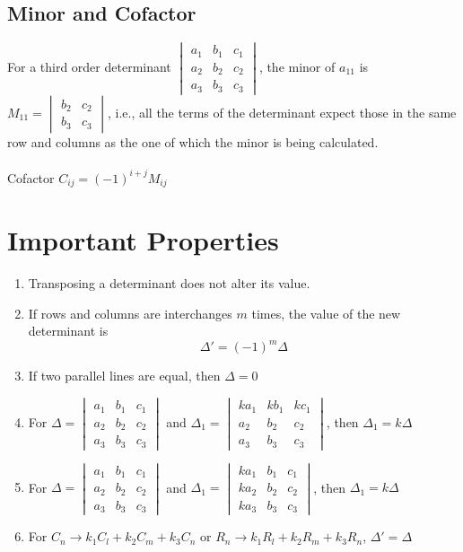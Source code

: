\documentclass[openany, oneside]{book}
\begin{document}
\subsection{Minor and Cofactor}
For a third order determinant
$\begin{vmatrix}
a_1&b_1&c_1\\
a_2&b_2&c_2\\
a_3&b_3&c_3
\end{vmatrix}$, the minor of $a_{11}$ is $M_{11}=\begin{vmatrix}b_2&c_2\\b_3&c_3\end{vmatrix}$, i.e., all the terms of the determinant expect those in the same row and columns as the one of which the minor is being calculated.
\paragraph{}Cofactor $C_{ij}=(-1)^{i+j} M_{ij}$

\section{Important Properties}
\begin{enumerate}
\item Transposing a determinant does not alter its value.
\item If rows and columns are interchanges $m$ times, the value of the new determinant is
\begin{equation}
\Delta'=(-1)^m \Delta
\end{equation}
\item If two parallel lines are equal, then $\Delta=0$
\item For $\Delta=\begin{vmatrix}a_1&b_1&c_1\\a_2&b_2&c_2\\a_3&b_3&c_3\end{vmatrix}$ and $\Delta_1=\begin{vmatrix}ka_1&kb_1&kc_1\\a_2&b_2&c_2\\a_3&b_3&c_3\end{vmatrix}$, then $\Delta_1=k\Delta$
\item For $\Delta=\begin{vmatrix}a_1&b_1&c_1\\a_2&b_2&c_2\\a_3&b_3&c_3\end{vmatrix}$ and $\Delta_1=\begin{vmatrix}ka_1&b_1&c_1\\ka_2&b_2&c_2\\ka_3&b_3&c_3\end{vmatrix}$, then $\Delta_1=k\Delta$
\item For $C_n\rightarrow k_1C_l+k_2C_m+k_3C_n$ or $R_n\rightarrow k_1R_l+k_2R_m+k_3R_n$, $\Delta'=\Delta$
\end{enumerate}
\end{document}
